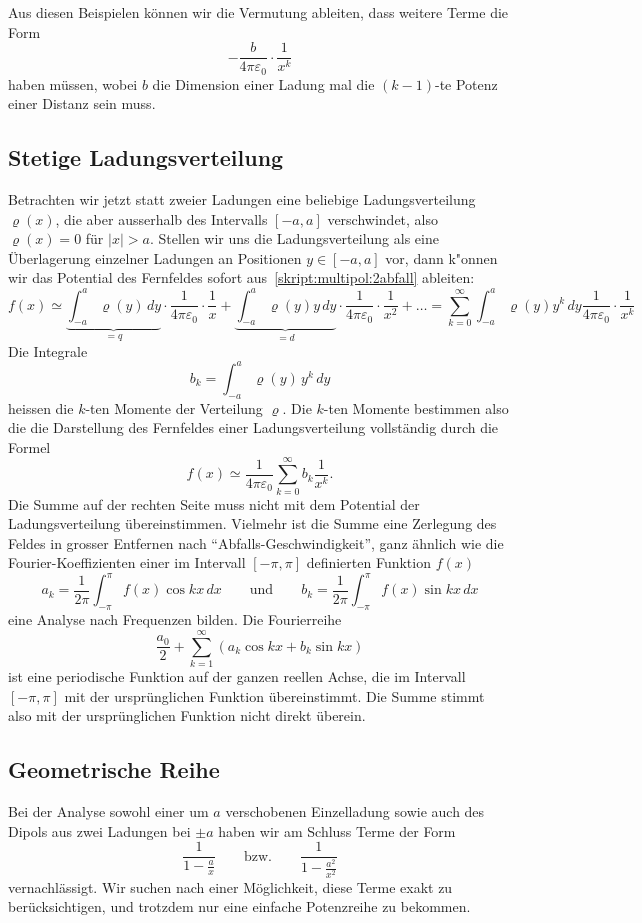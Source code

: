Aus diesen Beispielen können wir die Vermutung ableiten, dass weitere
Terme die Form
\[
-\frac{b}{4\pi\varepsilon_0}\cdot\frac1{x^k}
\]
haben müssen, wobei $b$ die Dimension einer Ladung mal die $(k-1)$-te
Potenz einer Distanz sein muss.

\subsection{Stetige Ladungsverteilung%
\label{skript:multipol:section:stetigeladungsverteilung}}
Betrachten wir jetzt statt zweier Ladungen eine beliebige 
Ladungsverteilung $\varrho(x)$, die aber ausserhalb des Intervalls
$[-a,a]$ verschwindet, also $\varrho(x)=0$ für $|x|>a$.
Stellen wir uns die Ladungsverteilung als eine Überlagerung einzelner
Ladungen an Positionen $y\in[-a,a]$ vor, dann k"onnen wir das
Potential des Fernfeldes sofort aus~\eqref{skript:multipol:2abfall}
ableiten:
\[
f(x)
\simeq
\underbrace{\int_{-a}^a \varrho(y)\,dy }_{\displaystyle =q}\cdot
\frac{1}{4\pi\varepsilon_0}\cdot\frac1x
+
\underbrace{\int_{-a}^a \varrho(y)y \,dy}_{\displaystyle =d}\cdot
\frac{1}{4\pi\varepsilon_0}\cdot\frac1{x^2}
+
\dots
=
\sum_{k=0}^\infty\int_{-a}^a\varrho(y)y^k\,dy\frac{1}{4\pi\varepsilon_0}\cdot\frac1{x^k} 
\]
Die Integrale 
\[
b_k=\int_{-a}^a \varrho(y)\,y^k\,dy
\]
heissen die $k$-ten Momente der Verteilung $\varrho$.
Die $k$-ten Momente bestimmen also die die Darstellung des Fernfeldes
einer Ladungsverteilung vollständig durch die Formel
\[
f(x)
\simeq
\frac1{4\pi\varepsilon_0}\sum_{k=0}^\infty b_k\frac{1}{x^k}.
\]
Die Summe auf der rechten Seite muss nicht mit dem Potential der
Ladungsverteilung übereinstimmen.
Vielmehr ist die Summe eine Zerlegung des Feldes in grosser Entfernen
nach ``Abfalls-Geschwindigkeit'',
ganz ähnlich wie die Fourier-Koeffizienten einer im Intervall
$[-\pi,\pi]$ definierten Funktion $f(x)$
\[
a_k=\frac1{2\pi}\int_{-\pi}^\pi f(x)\cos kx\,dx
\qquad\text{und}\qquad
b_k=\frac1{2\pi}\int_{-\pi}^\pi f(x)\sin kx\,dx
\]
eine Analyse nach Frequenzen bilden.
Die Fourierreihe
\[
\frac{a_0}2+\sum_{k=1}^\infty (a_k\cos kx+b_k\sin kx)
\]
ist eine periodische Funktion auf der ganzen reellen Achse, die
im Intervall $[-\pi,\pi]$ mit der ursprünglichen Funktion übereinstimmt.
Die Summe stimmt also mit der ursprünglichen Funktion nicht direkt
überein.

\subsection{Geometrische Reihe%
\label{skript:multipol:section:geometrischereihe}}
Bei der Analyse sowohl einer um $a$ verschobenen Einzelladung sowie auch
des Dipols aus zwei Ladungen bei $\pm a$ haben wir am Schluss Terme der
Form
\[
\frac1{1-\displaystyle\frac{a}{x}}
\qquad\text{bzw.}\qquad
\frac1{1-\displaystyle\frac{a^2}{x^2}}
\]
vernachlässigt.
Wir suchen nach einer Möglichkeit, diese Terme exakt zu berücksichtigen,
und trotzdem nur eine einfache Potenzreihe zu bekommen.

